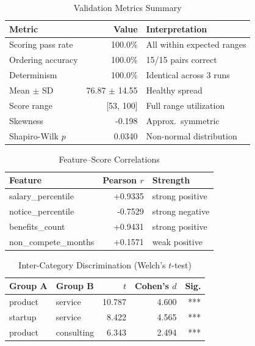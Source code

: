 \begin{table}[htbp]
\caption{Validation Metrics Summary}
\label{tab:validation}
\centering
\begin{tabular}{l r l}
\hline
\textbf{Metric} & \textbf{Value} & \textbf{Interpretation} \\
\hline
Scoring pass rate & 100.0\% & All within expected ranges \\
Ordering accuracy & 100.0\% & 15/15 pairs correct \\
Determinism & 100.0\% & Identical across 3 runs \\
Mean $\pm$ SD & 76.87 $\pm$ 14.55 & Healthy spread \\
Score range & [53, 100] & Full range utilization \\
Skewness & -0.198 & Approx.\ symmetric \\
Shapiro-Wilk $p$ & 0.0340 & Non-normal distribution \\
\hline
\end{tabular}
\end{table}

\begin{table}[htbp]
\caption{Feature--Score Correlations}
\label{tab:correlations}
\centering
\begin{tabular}{l r l}
\hline
\textbf{Feature} & \textbf{Pearson $r$} & \textbf{Strength} \\
\hline
salary\_percentile & +0.9335 & strong positive \\
notice\_percentile & -0.7529 & strong negative \\
benefits\_count & +0.9431 & strong positive \\
non\_compete\_months & +0.1571 & weak positive \\
\hline
\end{tabular}
\end{table}

\begin{table}[htbp]
\caption{Inter-Category Discrimination (Welch's $t$-test)}
\label{tab:categories}
\centering
\begin{tabular}{l l r r r}
\hline
\textbf{Group A} & \textbf{Group B} & \textbf{$t$} & \textbf{Cohen's $d$} & \textbf{Sig.} \\
\hline
product & service & 10.787 & 4.600 & *** \\
startup & service & 8.422 & 4.565 & *** \\
product & consulting & 6.343 & 2.494 & *** \\
\hline
\end{tabular}
\end{table}